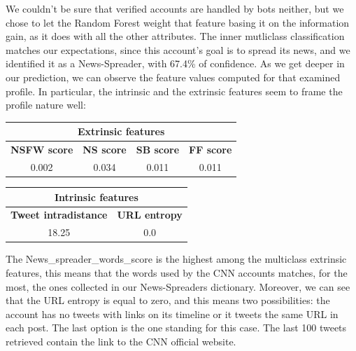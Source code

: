 We couldn't be sure that verified accounts are handled by bots neither, but we chose to let the Random Forest weight that feature basing it on the information gain, as it does with all the other attributes.
The inner mutliclass classification matches our expectations, since this account's goal is to spread its news, and we identified it as a News-Spreader, with 67.4\% of confidence.
As we get deeper in our prediction, we can observe the feature values computed for that examined profile. In particular, the intrinsic and the extrinsic features seem to frame the profile nature well:
\begin{center}
	\begin{tabular}{@{}c|c|c|c@{}}
		\multicolumn{4}{c}{Extrinsic features} \\
		\hline
		\multicolumn{1}{c|}{\textbf{NSFW score}} & 
		\multicolumn{1}{c|}{\textbf{NS score}} & 
		\multicolumn{1}{c|}{\textbf{SB score}} & 
		\multicolumn{1}{c}{\textbf{FF score}}\\
		\hline
		\multicolumn{1}{c|}{0.002} &
		\multicolumn{1}{c|}{0.034} &
		\multicolumn{1}{c|}{0.011} &
		\multicolumn{1}{c}{0.011} \\
		\hline
	\end{tabular}
\end{center}
\begin{center}
	\begin{tabular}{@{}c|c@{}}
		\multicolumn{2}{c}{Intrinsic features} \\
		\hline
		\multicolumn{1}{c|}{\textbf{Tweet intradistance}} & 
		\multicolumn{1}{c}{\textbf{URL entropy}}\\
		\hline
		\multicolumn{1}{c|}{18.25} &
		\multicolumn{1}{c}{0.0}\\
		\hline
	\end{tabular}
\end{center}

The News\_spreader\_words\_score is the highest among the multiclass extrinsic features, this means that the words used by the CNN accounts matches, for the most, the ones collected in our News-Spreaders dictionary. Moreover, we can see that the URL entropy is equal to zero, and this means two possibilities: the account has no tweets with links on its timeline or it tweets the same URL in each post. The last option is the one standing for this case. The last 100 tweets retrieved contain the link to the CNN official website.


